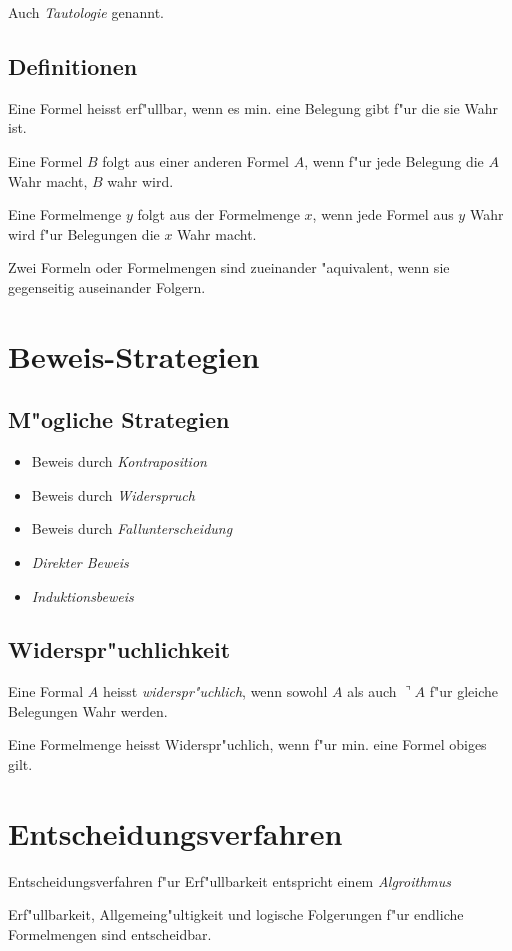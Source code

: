 Auch {\em Tautologie} genannt.

\subsection{Definitionen}
Eine Formel heisst erf"ullbar, wenn es min. eine Belegung gibt f"ur die
sie Wahr ist.

Eine Formel $B$ folgt aus einer anderen Formel $A$, wenn f"ur jede Belegung
die $A$ Wahr macht, $B$ wahr wird.

Eine Formelmenge $y$ folgt aus der Formelmenge $x$, wenn jede Formel aus $y$
Wahr wird f"ur Belegungen die $x$ Wahr macht.

Zwei Formeln oder Formelmengen sind zueinander "aquivalent, wenn sie
gegenseitig auseinander Folgern.

\section{Beweis-Strategien}
\subsection{M"ogliche Strategien}
\begin{itemize}
\item Beweis durch {\em Kontraposition}
\item Beweis durch {\em Widerspruch}
\item Beweis durch {\em Fallunterscheidung}
\item {\em Direkter Beweis}
\item {\em Induktionsbeweis}
\end{itemize}

\subsection{Widerspr"uchlichkeit}
Eine Formal $A$ heisst {\em widerspr"uchlich}, wenn sowohl $A$ als auch
$\urcorner A$ f"ur gleiche Belegungen Wahr werden.

Eine Formelmenge heisst Widerspr"uchlich, wenn f"ur min. eine Formel obiges gilt.

\section{Entscheidungsverfahren}
Entscheidungsverfahren f"ur Erf"ullbarkeit entspricht einem {\em Algroithmus}

Erf"ullbarkeit, Allgemeing"ultigkeit und logische Folgerungen f"ur endliche Formelmengen
sind entscheidbar.

